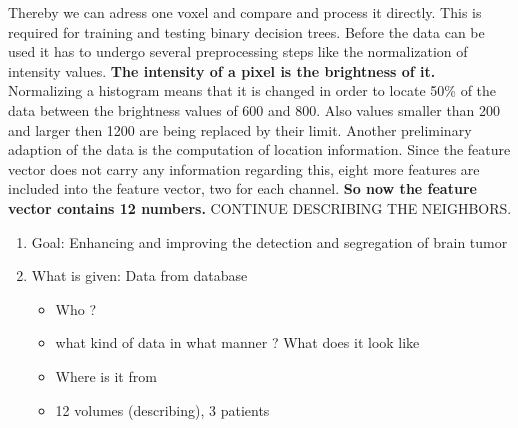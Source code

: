 \documentclass{article}
\begin{document}
    Thereby we can adress one voxel and compare and process it directly. This is required for training and testing binary decision trees. Before the data can be used it has to undergo several preprocessing steps like the normalization of intensity values. \textbf{The intensity of a pixel is the brightness of it.} Normalizing a histogram means that it is changed in order to locate 50\% of the data between the brightness values of 600 and 800. Also values smaller than 200 and larger then 1200 are being replaced by their limit. Another preliminary adaption of the data is the computation of location information. Since the feature vector does not carry any information regarding this, eight more features are included into the feature vector, two for each channel. \textbf{So now the feature vector contains 12 numbers.} CONTINUE DESCRIBING THE NEIGHBORS.





\newpage
    \begin{enumerate}
        \item Goal: Enhancing and improving the detection and segregation of brain tumor
        \item What is given: Data from database
        \begin{itemize}
            \item Who ? 
            \item what kind of data in what manner ? What does it look like 
            \item Where is it from 
            \item 12 volumes (describing), 3 patients 
        \end{itemize}
    \end{enumerate}
    
\end{document}
